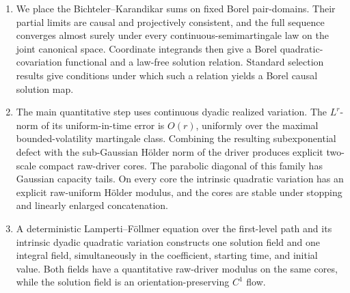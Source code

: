 \documentclass[11pt,reqno]{amsart}
\theoremstyle{plain}
\theoremstyle{definition}
\begin{document}
\begin{enumerate}[leftmargin=2.2em,label=(\roman*)]
  \item We place the Bichteler--Karandikar sums on fixed Borel pair-domains.
  Their partial limits
  are causal and projectively consistent, and the full sequence converges
  almost surely under every continuous-semimartingale law on the joint
  canonical space.  Coordinate integrands then give a Borel
  quadratic-covariation functional and a law-free solution relation.  Standard
  selection results give conditions under which such a relation yields a Borel
  causal solution map.

  \item The main quantitative step uses continuous dyadic realized variation.
  The \(L^r\)-norm of its uniform-in-time error is \(O(r)\), uniformly over
  the maximal bounded-volatility martingale class.  Combining the resulting
  subexponential defect with the sub-Gaussian H\"older
  norm of the driver produces explicit two-scale compact raw-driver cores.
  The parabolic diagonal of this family has Gaussian capacity tails.  On every core the intrinsic
  quadratic variation has an explicit raw-uniform H\"older modulus, and the
  cores are stable under stopping and linearly enlarged concatenation.

  \item A deterministic Lamperti--F\"ollmer equation over the first-level path
  and its intrinsic dyadic quadratic variation constructs one solution field
  and one integral field, simultaneously in the coefficient, starting time,
  and initial value.  Both fields have a quantitative raw-driver modulus on
  the same cores, while the solution field is an orientation-preserving
  \(C^1\) flow.
\end{enumerate}
\end{document}
